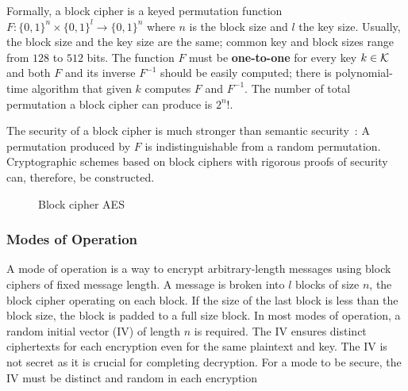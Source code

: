 Formally, a block cipher is a keyed permutation function $F: \{ 0, 1\}^{n} \times \{ 0, 1\}^{l} \rightarrow \{ 0, 1\}^{n}$ where $n$ is the block size and $l$ the key size. Usually, the block size and the key size are the same; common key and block sizes range from $128$ to $512$ bits. The function $F$ must be \textbf{one-to-one} for every key $k \in \mathcal{K}$ and both $F$ and its inverse $F^{-1}$ should be easily computed; there is polynomial-time algorithm that given $k$ computes $F$ and $F^{-1}$. The number of total permutation a block cipher can produce is $2^{n}!$.

The security of a block cipher is much stronger than semantic security~\cite{boneh_crypto}: A permutation produced by $F$ is indistinguishable from a random permutation. Cryptographic schemes based on block ciphers with rigorous proofs of security can, therefore, be constructed.

\begin{figure}[!ht]
    \centering
  \caption{Block cipher AES}
  \label{fig:sym:block:aes}
\end{figure}

\subsubsection[Modes of Operation]{Modes of Operation~\cite{Katz:2014:IMC:2700550}}
\label{preliminaries:sym:modes}

A mode of operation is a way to encrypt arbitrary-length messages using block ciphers of fixed message length. A message is broken into $l$ blocks of size $n$, the block cipher operating on each block. If the size of the last block is less than the block size, the block is padded to a full size block. In most modes of operation, a random initial vector (IV) of length $n$ is required. The IV ensures distinct ciphertexts for each encryption even for the same plaintext and key. The IV is not secret as it is crucial for completing decryption. For a mode to be secure, the IV must be distinct and random in each encryption~\cite{Katz:2014:IMC:2700550}

